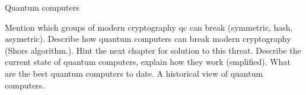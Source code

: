 

Quantum computers 

Mention which groups of modern cryptography qc can break (symmetric, hash, asymetric). Describe how quantum computers can break modern cryptography (Shors algorithm.). Hint the next chapter for solution to this threat. Describe the current state of quantum computers, explain how they work (smplified). What are the best quantum computers to date. A historical view of quantum computers. 


